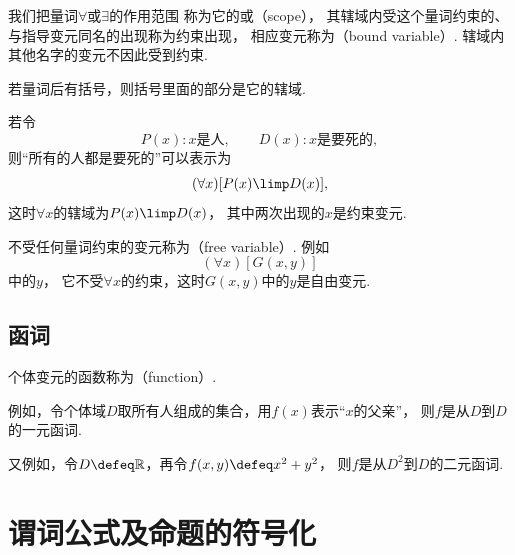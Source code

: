 我们把量词\(\forall\)或\(\exists\)的作用范围
称为它的或（scope），
其辖域内受这个量词约束的、与指导变元同名的出现称为约束出现，
相应变元称为（bound variable）.
辖域内其他名字的变元不因此受到约束.

若量词后有括号，则括号里面的部分是它的辖域.

若令\begin{equation*}
	P(x):
	\text{$x$是人},
	\qquad
	D(x):
	\text{$x$是要死的},
\end{equation*}
则“所有的人都是要死的”可以表示为\begin{equation*}
	(\forall x)[P(x) \limp D(x)],
\end{equation*}
这时\(\forall x\)的辖域为\(P(x) \limp D(x)\)，
其中两次出现的\(x\)是约束变元.

不受任何量词约束的变元称为（free variable）.
例如\begin{equation*}
	(\forall x)[G(x,y)]
\end{equation*}中的\(y\)，
它不受\(\forall x\)的约束，这时\(G(x,y)\)中的\(y\)是自由变元.

\subsection{函词}
个体变元的函数称为（function）.

例如，令个体域\(D\)取所有人组成的集合，用\(f(x)\)表示“\(x\)的父亲”，
则\(f\)是从\(D\)到\(D\)的一元函词.

又例如，令\(D \defeq \mathbb{R}\)，再令\(f(x,y) \defeq x^2 + y^2\)，
则\(f\)是从\(D^2\)到\(D\)的二元函词.

\section{谓词公式及命题的符号化}
